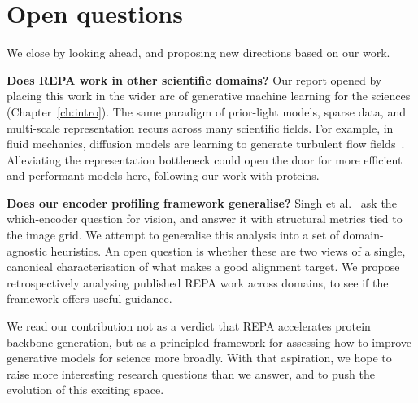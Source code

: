 \documentclass[12pt,a4paper,twoside]{report}
\begin{document}
\section{Open questions}
\label{sec:conc-open-questions}

We close by looking ahead, and proposing new directions based on our work.

\textbf{Does REPA work in other scientific domains?} Our report opened by placing this work in the wider arc of generative machine learning for the sciences (Chapter~\ref{ch:intro}). The same paradigm of prior-light models, sparse data, and multi-scale representation recurs across many scientific fields. For example, in fluid mechanics, diffusion models are learning to generate turbulent flow fields~\cite{TurbulenceDiffusion}. Alleviating the representation bottleneck could open the door for more efficient and performant models here, following our work with proteins.

\textbf{Does our encoder profiling framework generalise?} Singh et al.~\cite{SpatialStructure} ask the which-encoder question for vision, and answer it with structural metrics tied to the image grid. We attempt to generalise this analysis into a set of domain-agnostic heuristics. An open question is whether these are two views of a single, canonical characterisation of what makes a good alignment target. We propose retrospectively analysing published REPA work across domains, to see if the framework offers useful guidance.

We read our contribution not as a verdict that REPA accelerates protein backbone generation, but as a principled framework for assessing how to improve generative models for science more broadly. With that aspiration, we hope to raise more interesting research questions than we answer, and to push the evolution of this exciting space.

\label{lastcontentpage}
\end{document}
